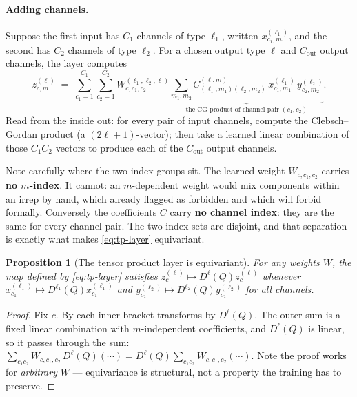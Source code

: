 \documentclass[11pt,a4paper]{report}
\newtheorem{proposition}[proposition]{Proposition}
\theoremstyle{definition}
\theoremstyle{remark}
\begin{document}
\paragraph{Adding channels.} Suppose the first input has $C_1$ channels of
type $\ell_1$, written $x^{(\ell_1)}_{c_1,m_1}$, and the second has $C_2$
channels of type $\ell_2$. For a chosen output type $\ell$ and $C_{\text{out}}$
output channels, the layer computes
\begin{equation}
\label{eq:tp-layer}
z^{(\ell)}_{c,m}
\;=\;
\sum_{c_1=1}^{C_1}\sum_{c_2=1}^{C_2}
W^{(\ell_1,\ell_2,\ell)}_{c,c_1,c_2}
\underbrace{\sum_{m_1,m_2}
C^{(\ell,m)}_{(\ell_1,m_1)(\ell_2,m_2)}\,
x^{(\ell_1)}_{c_1,m_1}\,y^{(\ell_2)}_{c_2,m_2}}_{\text{the CG product of channel pair }(c_1,c_2)} .
\end{equation}
Read from the inside out: for every pair of input channels, compute the
Clebsch--Gordan product (a $(2\ell+1)$-vector); then take a learned linear
combination of those $C_1C_2$ vectors to produce each of the
$C_{\text{out}}$ output channels.

Note carefully where the two index groups sit. The learned weight
$W_{c,c_1,c_2}$ carries \textbf{no $m$-index}. It cannot: an $m$-dependent
weight would mix components within an irrep by hand, which
 already flagged as forbidden and which
 will forbid formally. Conversely the coefficients
$C$ carry \textbf{no channel index}: they are the same for every channel
pair. The two index sets are disjoint, and that separation is exactly what
makes \eqref{eq:tp-layer} equivariant.

\begin{proposition}[The tensor product layer is equivariant]
\label{prop:tp-layer-equivariant}
For any weights $W$, the map defined by \eqref{eq:tp-layer} satisfies
$z^{(\ell)}_{c}\mapsto D^\ell(Q)z^{(\ell)}_{c}$ whenever
$x^{(\ell_1)}_{c_1}\mapsto D^{\ell_1}(Q)x^{(\ell_1)}_{c_1}$ and
$y^{(\ell_2)}_{c_2}\mapsto D^{\ell_2}(Q)y^{(\ell_2)}_{c_2}$ for all channels.
\end{proposition}

\begin{proof}
Fix $c$. By  each inner bracket transforms by
$D^\ell(Q)$. The outer sum is a fixed linear combination with
$m$-independent coefficients, and $D^\ell(Q)$ is linear, so it passes
through the sum:
$\sum_{c_1c_2}W_{c,c_1,c_2}\,D^\ell(Q)(\cdots) = D^\ell(Q)\sum_{c_1c_2}W_{c,c_1,c_2}(\cdots)$.
Note the proof works for \emph{arbitrary} $W$ --- equivariance is
structural, not a property the training has to preserve.
\end{proof}
\end{document}
